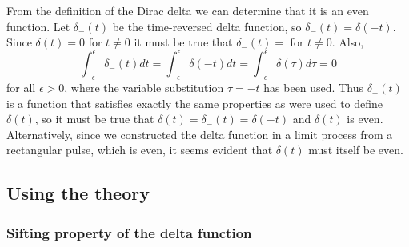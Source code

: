 \documentclass[10pt]{beamer}
\begin{document}
From the definition of the Dirac delta we can determine that it is an even function.  Let $\delta_{-}(t)$ be the time-reversed delta function, so $\delta_{-}(t) = \delta(-t)$.  Since $\delta(t) = 0$ for $t \neq 0$ it must be true that $\delta_{-}(t) = $ for $t \neq 0$.  Also,
\begin{equation*}
  \int_{-\epsilon}^{\epsilon} \delta_{-}(t) dt = \int_{-\epsilon}^{\epsilon} \delta(-t) dt = \int_{-\epsilon}^{\epsilon} \delta(\tau) d\tau = 0
\end{equation*}
for all $\epsilon > 0$, where the variable substitution $\tau = -t$ has been used.  Thus $\delta_{-}(t)$ is a function that satisfies exactly the same properties as were used to define $\delta(t)$, so it must be true that $\delta(t) = \delta_{-}(t) = \delta(-t)$ and $\delta(t)$ is even.  Alternatively, since we constructed the delta function in a limit process from a rectangular pulse, which is even, it seems evident that $\delta(t)$ must itself be even.

\subsection{Using the theory}

\subsubsection{Sifting property of the delta function}
\end{document}

